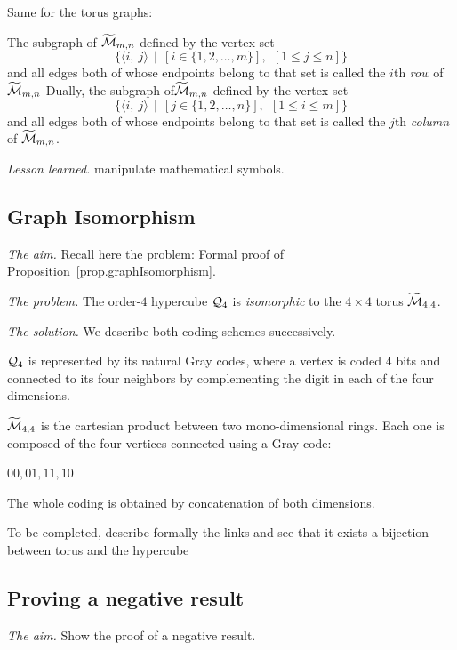 Same for the torus graphs:

The subgraph of $\widetilde{\mbox{$\cal M$}}_{m,n}$ defined by the vertex-set
\[ \{ \langle i, \ j \rangle  \ \ | \ \ \left[i \in \{1, 2, \ldots,
  m\}\right], \ \ \left[1 \leq j \leq n\right]\}
\]
and all edges both of whose endpoints belong to that set is called the
$i$th {\it row} of $\widetilde{\mbox{$\cal M$}}_{m,n}$
Dually, the subgraph of$\widetilde{\mbox{$\cal M$}}_{m,n}$ defined by the vertex-set
\[ \{ \langle i, \ j \rangle  \ \ | \ \ \left[j \in \{1, 2, \ldots,
  n\}\right], \ \ \left[1 \leq i \leq m\right] \}
\]
and all edges both of whose endpoints belong to that set is called the
$j$th {\it column} of $\widetilde{\mbox{$\cal M$}}_{m,n}$.
\medskip

\noindent \textit{Lesson learned.}
manipulate mathematical symbols. 


\subsection{Graph Isomorphism}
\label{Exercice:isomorphism}

\noindent \textit{The aim.}
Recall here the problem:
Formal proof of Proposition~\ref{prop.graphIsomorphism}. 
\medskip

\noindent \textit{The problem.}
The order-$4$ hypercube $\mbox{$\cal Q$}_4$ is \textit{isomorphic} to the $4 \times
4$ torus $\widetilde{\mbox{$\cal M$}}_{4,4}$.
\medskip

\noindent \textit{The solution.}
We describe both coding schemes successively. 

$\mbox{$\cal Q$}_4$ is represented by its natural Gray codes,
where a vertex is coded 4 bits and connected to its four neighbors by complementing 
the digit in each of the four dimensions.
\medskip

$\widetilde{\mbox{$\cal M$}}_{4,4}$ is the cartesian product between two mono-dimensional rings.
Each one is composed of the four vertices connected using a Gray code:

$00, 01, 11, 10$

The whole coding is obtained by concatenation of both dimensions.
\medskip

{\Denis To be completed, describe formally the links and see that it exists a bijection between torus and the hypercube}


\subsection{Proving a negative result}

\noindent \textit{The aim.}
Show the proof of a negative result.
\medskip

